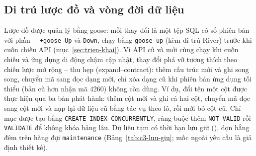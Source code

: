 \subsection{Di trú lược đồ và vòng đời dữ liệu}\label{ssec:di-tru}

Lược đồ được quản lý bằng goose: mỗi thay đổi là một tệp SQL có số phiên bản với phần \texttt{-- +goose Up} và \texttt{Down}, chạy bằng \texttt{goose up} (kèm di trú River) trước khi cuốn chiếu API (mục~\ref{sec:trien-khai}). Vì API cũ và mới cùng chạy khi cuốn chiếu và ứng dụng di động chậm cập nhật, thay đổi phá vỡ tương thích theo chiến lược mở rộng -- thu hẹp (expand--contract): thêm cấu trúc mới và ghi song song, chuyển mã sang đọc dạng mới, chỉ xóa dạng cũ khi phiên bản ứng dụng tối thiểu (bản cũ hơn nhận mã 4260) không còn dùng. Ví dụ, đổi tên một cột được thực hiện qua ba bản phát hành: thêm cột mới và ghi cả hai cột, chuyển mã đọc sang cột mới và nạp lại dữ liệu cũ bằng tác vụ theo lô, rồi mới bỏ cột cũ. Chỉ mục được tạo bằng \texttt{CREATE INDEX CONCURRENTLY}, ràng buộc thêm \texttt{NOT VALID} rồi \texttt{VALIDATE} để không khóa bảng lâu. Dữ liệu tạm có thời hạn lưu giữ (), dọn hằng đêm trên hàng đợi \texttt{maintenance} (Bảng~\ref{tab:c3-luu-giu}; mốc ngoài yêu cầu là giả định thiết kế).

